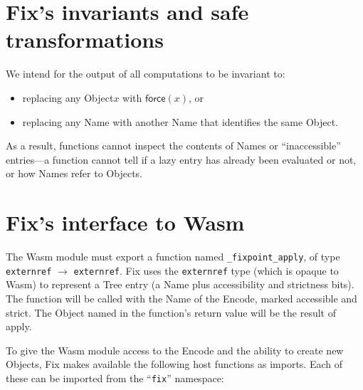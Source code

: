 \documentclass{article}
\newcommand{\object}{\textrm{Object}\xspace}
\newcommand{\objects}{\textrm{Object}s\xspace}
\newcommand{\encode}{\textrm{Encode}\xspace}
\newcommand{\name}{\textrm{Name}\xspace}
\newcommand{\names}{\textrm{Name}s\xspace}
\newcommand{\tree}{\textrm{Tree}\xspace}
\newcommand{\bs}{\vspace{\baselineskip}}
\newcommand{\apply}{\textsf{apply}}
\newcommand{\force}{\textsf{force}}
\begin{document}
\section{Fix's invariants and safe transformations}

We intend for the output of all computations to be invariant to:

\begin{itemize}[itemsep=0pt]

\item replacing any \object $x$ with $\force(x)$, or

\item replacing any \name with another \name that identifies the same \object.

\end{itemize}

As a result, functions cannot inspect the contents of \names or
``inaccessible'' entries---a function cannot tell if a lazy entry has
already been evaluated or not, or how \names refer to \objects.

\section{Fix's interface to Wasm}
\label{s:imports}

The Wasm module must export a function named {\tt \_fixpoint\_apply},
of type \texttt{externref} $\rightarrow$ \texttt{externref}. Fix uses
the \texttt{externref} type (which is opaque to Wasm) to represent a
\tree entry (a \name plus accessibility and strictness bits). The
function will be called with the \name of the \encode, marked
accessible and strict. The \object named in the function's return
value will be the result of \apply.

\bs

To give the Wasm module access to the \encode and the ability to
create new \objects, Fix makes available the following host functions
as imports. Each of these can be imported from the ``\texttt{fix}'' namespace:
\end{document}
